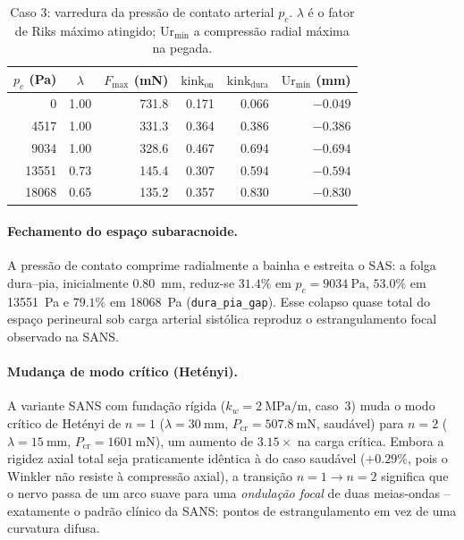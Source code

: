 \begin{table}[h!]
\centering
\small
\caption{Caso 3: varredura da pressão de contato arterial $p_c$. $\lambda$ é o
fator de Riks máximo atingido; $\mathrm{Ur}_{\min}$ a compressão radial máxima
na pegada.}
\label{tab:res-caso3sweep}
\begin{tabular}{r c r r r r}
\toprule
$p_c$ (\si{\pascal}) & $\lambda$ & $F_{\max}$ (\si{\milli\newton}) & $\mathrm{kink}_{\mathrm{on}}$ & $\mathrm{kink}_{\mathrm{dura}}$ & $\mathrm{Ur}_{\min}$ (\si{\milli\meter}) \\
\midrule
0      & 1.00 & 731.8 & 0.171 & 0.066 & $-0.049$ \\
4517   & 1.00 & 331.3 & 0.364 & 0.386 & $-0.386$ \\
9034   & 1.00 & 328.6 & 0.467 & 0.694 & $-0.694$ \\
13551  & 0.73 & 145.4 & 0.307 & 0.594 & $-0.594$ \\
18068  & 0.65 & 135.2 & 0.357 & 0.830 & $-0.830$ \\
\bottomrule
\end{tabular}
\end{table}

\paragraph{Fechamento do espaço subaracnoide.} A pressão de contato comprime radialmente a bainha e estreita o SAS: a folga dura--pia, inicialmente \SI{0.80}{\milli\meter}, reduz-se $31.4\%$ em $p_c = \SI{9034}{\pascal}$, $53.0\%$ em \SI{13551}{\pascal} e $79.1\%$ em \SI{18068}{\pascal} (\texttt{dura\_pia\_gap}). Esse colapso quase total do espaço perineural sob carga arterial sistólica reproduz o estrangulamento focal observado na SANS.

\paragraph{Mudança de modo crítico (Hetényi).} A variante SANS com fundação rígida ($k_w = \SI{2}{\mega\pascal\per\meter}$, caso~3) muda o modo crítico de Hetényi de $n = 1$ ($\lambda = \SI{30}{\milli\meter}$, $P_{\mathrm{cr}} = \SI{507.8}{\milli\newton}$, saudável) para $n = 2$ ($\lambda = \SI{15}{\milli\meter}$, $P_{\mathrm{cr}} = \SI{1601}{\milli\newton}$), um aumento de $3.15\times$ na carga crítica. Embora a rigidez axial total seja praticamente idêntica à do caso saudável ($+0.29\%$, pois o Winkler não resiste à compressão axial), a transição $n=1 \to n=2$ significa que o nervo passa de um arco suave para uma \emph{ondulação focal} de duas meias-ondas -- exatamente o padrão clínico da SANS: pontos de estrangulamento em vez de uma curvatura difusa.

